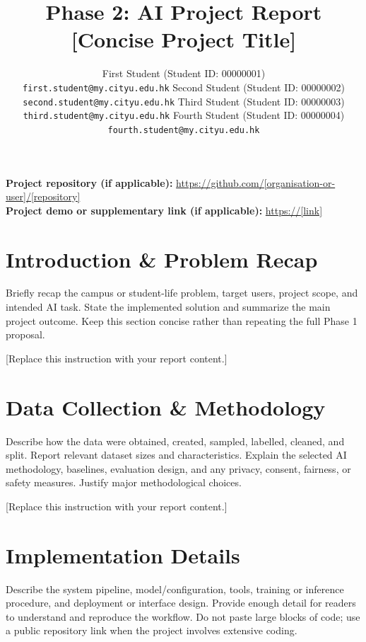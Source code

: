 \documentclass{article}
\title{Phase 2: AI Project Report\\
\large [Concise Project Title]}
\author{
  First Student (Student ID: 00000001)\\
  \texttt{first.student@my.cityu.edu.hk}
  \And
  Second Student (Student ID: 00000002)\\
  \texttt{second.student@my.cityu.edu.hk}
  \AND
  Third Student (Student ID: 00000003)\\
  \texttt{third.student@my.cityu.edu.hk}
  \And
  Fourth Student (Student ID: 00000004)\\
  \texttt{fourth.student@my.cityu.edu.hk}
}
\begin{document}
\maketitle

\noindent\textbf{Project repository (if applicable):} \url{https://github.com/[organisation-or-user]/[repository]}\\
\textbf{Project demo or supplementary link (if applicable):} \url{https://[link]}


\section{Introduction \& Problem Recap}
Briefly recap the campus or student-life problem, target users, project scope, and intended AI task. State the implemented solution and summarize the main project outcome. Keep this section concise rather than repeating the full Phase 1 proposal.

[Replace this instruction with your report content.]

\section{Data Collection \& Methodology}
Describe how the data were obtained, created, sampled, labelled, cleaned, and split. Report relevant dataset sizes and characteristics. Explain the selected AI methodology, baselines, evaluation design, and any privacy, consent, fairness, or safety measures. Justify major methodological choices.

[Replace this instruction with your report content.]

\section{Implementation Details}
Describe the system pipeline, model/configuration, tools, training or inference procedure, and deployment or interface design. Provide enough detail for readers to understand and reproduce the workflow. Do not paste large blocks of code; use a public repository link when the project involves extensive coding.

\end{document}

